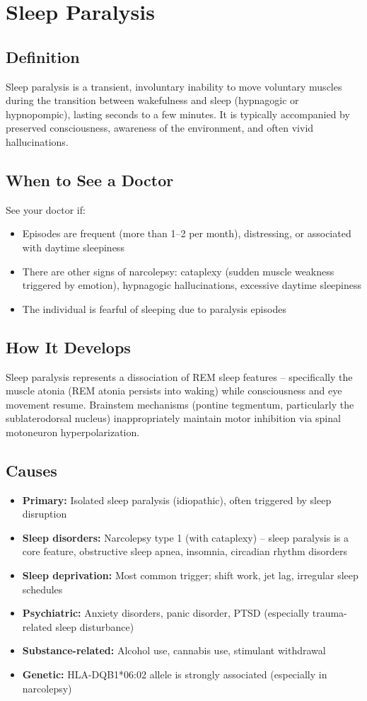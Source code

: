 \chapter{Sleep Paralysis}

\section*{Definition}
Sleep paralysis is a transient, involuntary inability to move voluntary muscles during the transition between wakefulness and sleep (hypnagogic or hypnopompic), lasting seconds to a few minutes. It is typically accompanied by preserved consciousness, awareness of the environment, and often vivid hallucinations.

\section*{When to See a Doctor}
See your doctor if:
\begin{itemize}
  \item Episodes are frequent (more than 1--2 per month), distressing, or associated with daytime sleepiness
  \item There are other signs of narcolepsy: cataplexy (sudden muscle weakness triggered by emotion), hypnagogic hallucinations, excessive daytime sleepiness
  \item The individual is fearful of sleeping due to paralysis episodes
\end{itemize}

\section*{How It Develops}
Sleep paralysis represents a dissociation of REM sleep features -- specifically the muscle atonia (REM atonia persists into waking) while consciousness and eye movement resume. Brainstem mechanisms (pontine tegmentum, particularly the sublaterodorsal nucleus) inappropriately maintain motor inhibition via spinal motoneuron hyperpolarization.

\section*{Causes}
\begin{itemize}
  \item \textbf{Primary:} Isolated sleep paralysis (idiopathic), often triggered by sleep disruption
  \item \textbf{Sleep disorders:} Narcolepsy type 1 (with cataplexy) -- sleep paralysis is a core feature, obstructive sleep apnea, insomnia, circadian rhythm disorders
  \item \textbf{Sleep deprivation:} Most common trigger; shift work, jet lag, irregular sleep schedules
  \item \textbf{Psychiatric:} Anxiety disorders, panic disorder, PTSD (especially trauma-related sleep disturbance)
  \item \textbf{Substance-related:} Alcohol use, cannabis use, stimulant withdrawal
  \item \textbf{Genetic:} HLA-DQB1*06:02 allele is strongly associated (especially in narcolepsy)
\end{itemize}

